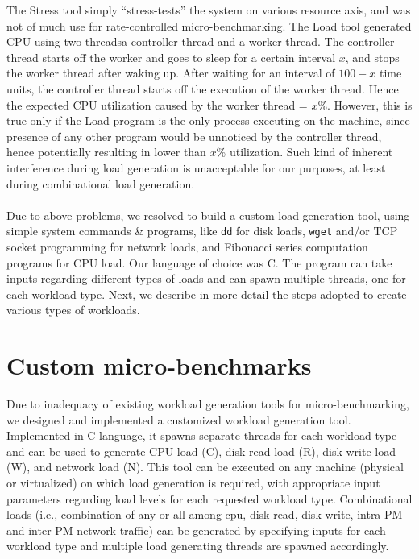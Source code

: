 The Stress tool simply ``stress-tests'' the 
system on various resource axis, and was not of much use 
for rate-controlled micro-benchmarking.
The Load tool generated CPU using two threads\textemdash{}a controller 
thread and a worker thread.
The controller thread starts off the worker and goes to sleep 
for a certain interval $x$, and stops
the worker thread after waking up. After waiting for an interval 
of $100-x$ time units, the controller thread
starts off the execution of the worker thread. Hence the 
expected CPU utilization caused by the worker thread = $x$\%. 
However, this is true only if the Load program is the only process executing
on the machine, since presence of any other program would 
be unnoticed by the controller
thread, hence potentially resulting in lower than $x$\% utilization. 
Such kind of inherent 
interference during load generation is unacceptable for our 
purposes, at least during combinational load generation.
\\
\\
Due to above problems, we resolved to build a custom load 
generation tool, using simple system commands \& programs, like 
\texttt{dd} for disk loads, \texttt{wget} and/or TCP socket programming 
for network loads, and Fibonacci series computation programs for 
CPU load. Our language of choice was C. The program can take
inputs regarding different types of loads and can spawn multiple 
threads, one for each workload type. Next, we describe in more detail 
the steps adopted to create various types of workloads.

\section{Custom micro-benchmarks}
Due to inadequacy of existing workload generation tools for micro-benchmarking, we 
designed and implemented a customized workload generation tool. Implemented in C language,
it spawns separate threads for each workload type and can be used to generate CPU load (C),
disk read load (R), disk write load (W), and network load (N). This tool can be executed on
any machine (physical or virtualized) on which load generation is required, with appropriate
input parameters regarding load levels for each requested workload type. Combinational loads
(i.e., combination of any or all among cpu, disk-read, disk-write, intra-PM and inter-PM
network traffic)
can be generated by specifying inputs for each workload type and multiple load generating
threads are spawned accordingly. 

